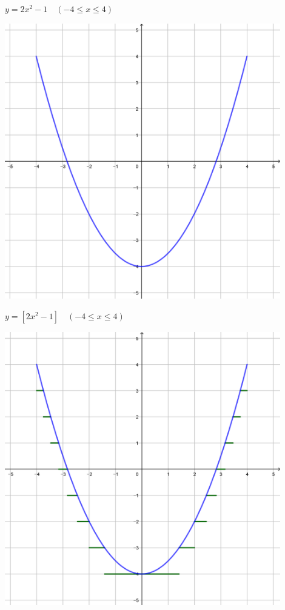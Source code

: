 \documentclass[a4paper]{oblivoir}
\begin{document}
\begin{minipage}{0.45\textwidth}\centering
\(y=2x^2-1\quad(-4\le x\le4)\)
\par\bigskip\includegraphics[width=0.9\textwidth]{img/y=.5x^2-4}
\end{minipage}
\begin{minipage}{0.45\textwidth}\centering
\(y=[2x^2-1]\quad(-4\le x\le4)\)
\par\bigskip\includegraphics[width=0.9\textwidth]{img/y=[.5x^2-4]}
\end{minipage}\bigskip\bigskip\par
\end{document}
